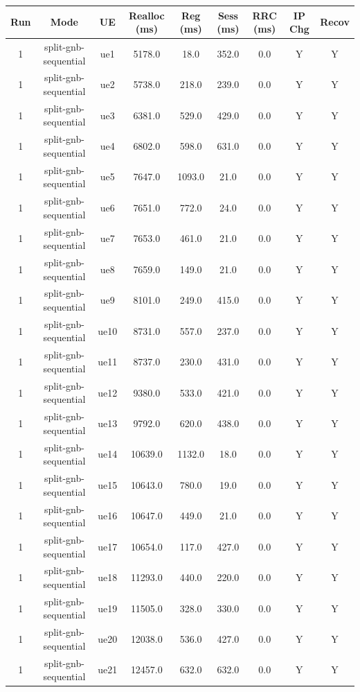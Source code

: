 \begin{table}[ht]
\centering
\begin{tabular}{|c|c|c|c|c|c|c|c|c|}
\hline
Run & Mode & UE & Realloc (ms) & Reg (ms) & Sess (ms) & RRC (ms) & IP Chg & Recov \\
\hline
1 & split-gnb-sequential & ue1 & 5178.0 & 18.0 & 352.0 & 0.0 & Y & Y \\
1 & split-gnb-sequential & ue2 & 5738.0 & 218.0 & 239.0 & 0.0 & Y & Y \\
1 & split-gnb-sequential & ue3 & 6381.0 & 529.0 & 429.0 & 0.0 & Y & Y \\
1 & split-gnb-sequential & ue4 & 6802.0 & 598.0 & 631.0 & 0.0 & Y & Y \\
1 & split-gnb-sequential & ue5 & 7647.0 & 1093.0 & 21.0 & 0.0 & Y & Y \\
1 & split-gnb-sequential & ue6 & 7651.0 & 772.0 & 24.0 & 0.0 & Y & Y \\
1 & split-gnb-sequential & ue7 & 7653.0 & 461.0 & 21.0 & 0.0 & Y & Y \\
1 & split-gnb-sequential & ue8 & 7659.0 & 149.0 & 21.0 & 0.0 & Y & Y \\
1 & split-gnb-sequential & ue9 & 8101.0 & 249.0 & 415.0 & 0.0 & Y & Y \\
1 & split-gnb-sequential & ue10 & 8731.0 & 557.0 & 237.0 & 0.0 & Y & Y \\
1 & split-gnb-sequential & ue11 & 8737.0 & 230.0 & 431.0 & 0.0 & Y & Y \\
1 & split-gnb-sequential & ue12 & 9380.0 & 533.0 & 421.0 & 0.0 & Y & Y \\
1 & split-gnb-sequential & ue13 & 9792.0 & 620.0 & 438.0 & 0.0 & Y & Y \\
1 & split-gnb-sequential & ue14 & 10639.0 & 1132.0 & 18.0 & 0.0 & Y & Y \\
1 & split-gnb-sequential & ue15 & 10643.0 & 780.0 & 19.0 & 0.0 & Y & Y \\
1 & split-gnb-sequential & ue16 & 10647.0 & 449.0 & 21.0 & 0.0 & Y & Y \\
1 & split-gnb-sequential & ue17 & 10654.0 & 117.0 & 427.0 & 0.0 & Y & Y \\
1 & split-gnb-sequential & ue18 & 11293.0 & 440.0 & 220.0 & 0.0 & Y & Y \\
1 & split-gnb-sequential & ue19 & 11505.0 & 328.0 & 330.0 & 0.0 & Y & Y \\
1 & split-gnb-sequential & ue20 & 12038.0 & 536.0 & 427.0 & 0.0 & Y & Y \\
1 & split-gnb-sequential & ue21 & 12457.0 & 632.0 & 632.0 & 0.0 & Y & Y \\

\end{tabular}
\end{table}
